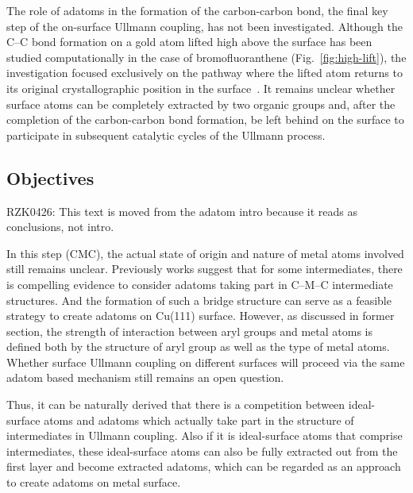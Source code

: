 \documentclass[%
 reprint,
 amsmath,amssymb,
 aps,
prb,
floatfix,
]{revtex4-2}
\newcommand{\lock}{\color{red}}
\newcommand{\lock}{\color{red}}
\newcommand{\comm}{\color{Purple}} %
\begin{document}

{\lock

The role of adatoms in the formation of the carbon-carbon bond, the final key step of the on-surface Ullmann coupling, has not been investigated. Although the C--C bond formation on a gold atom lifted high above the surface has been studied computationally in the case of bromofluoranthene (Fig.~\ref{fig:high-lift}), the investigation focused exclusively on the pathway where the lifted atom returns to its original crystallographic position in the surface~\cite{jpcc2018}. It remains unclear whether surface atoms can be completely extracted by two organic groups and, after the completion of the carbon-carbon bond formation, be left behind on the surface to participate in subsequent catalytic cycles of the Ullmann process.

}

\subsection{Objectives}

{\comm RZK0426: This text is moved from the adatom intro because it reads as conclusions, not intro.} 

{\color{blue} In this step (CMC), the actual state of origin and nature of metal atoms involved still remains unclear. Previously works suggest that for some intermediates, there is compelling evidence to consider adatoms taking part in C--M--C intermediate structures. And the formation of such a bridge structure can serve as a feasible strategy to create adatoms on Cu(111) surface. However, as discussed in former section, the strength of interaction between aryl groups and metal atoms is defined both by the structure of aryl group as well as the type of metal atoms. Whether surface Ullmann coupling on different surfaces will proceed via the same adatom based mechanism still remains an open question.}

{\color{blue} Thus, it can be naturally derived that there is a competition between ideal-surface atoms and adatoms which actually take part in the structure of intermediates in Ullmann coupling. Also if it is ideal-surface atoms that comprise intermediates, these ideal-surface atoms can also be fully extracted out from the first layer and become extracted adatoms, which can be regarded as an approach to create adatoms on metal surface.}
\end{document}
